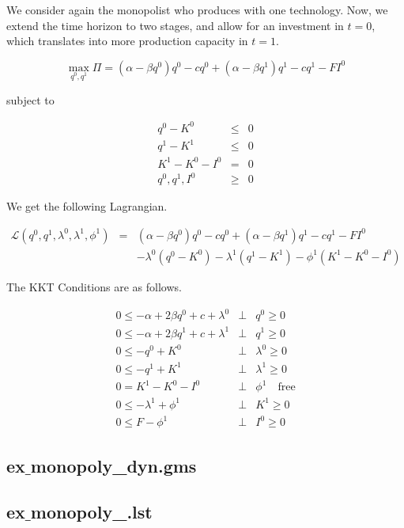 \documentclass[11pt,a4paper]{article}
\begin{document}
We consider again the monopolist who produces with one technology. Now, we extend the time horizon to two stages, and allow for an investment in $t=0$, which translates into more production capacity in $t=1$.

\begin{equation*}
	\max_{q^0,q^1}\Pi = (\alpha-\beta q^0)q^0 - cq^0 +  (\alpha-\beta q^1)q^1 - cq^1 -FI^0
\end{equation*}

subject to

\begin{eqnarray*}
	q^0 - K^0 &\leq& 0\\
	q^1 - K^1 &\leq& 0\\
        K^1 - K^0 - I^0 &=& 0\\
	q^0,q^1,I^0 &\geq& 0 
\end{eqnarray*}
 
We get the following Lagrangian.

\begin{eqnarray*}
	\mathcal{L}(q^0,q^1,\lambda^0,\lambda^1,\phi^1)&=& (\alpha-\beta q^0)q^0 - cq^0 +  (\alpha-\beta q^1)q^1 - cq^1 -FI^0 \\
        && - \lambda^0(q^0-K^0) - \lambda^1(q^1-K^1) - \phi^1(K^1-K^0-I^0)
\end{eqnarray*}

The KKT Conditions are as follows.

\begin{eqnarray*}
	0 \leq -\alpha + 2\beta q^0 + c + \lambda^0 &\bot& q^0 \geq 0\\
        0 \leq -\alpha + 2\beta q^1 + c + \lambda^1 &\bot& q^1 \geq 0\\
	0 \leq -q^0 + K^0 &\bot& \lambda^0 \geq 0 \\
        0 \leq -q^1 + K^1 &\bot& \lambda^1 \geq 0 \\
        0 = K^1 - K^0 - I^0 &\bot& \phi^1 \quad \mbox{free} \\
        0 \leq -\lambda^1 + \phi^1 &\bot& K^1 \geq 0 \\
        0 \leq F - \phi^1 &\bot& I^0 \geq 0 
\end{eqnarray*}


\subsection*{ex$\_$monopoly\_dyn.gms}



\subsection*{ex$\_$monopoly\_.lst}
\end{document}
